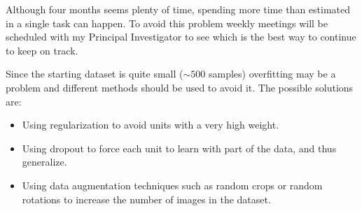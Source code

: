 
Although four months seems plenty of time, spending more time than estimated in a single task
can happen. To avoid this problem weekly meetings will be scheduled with my Principal Investigator
to see which is the best way to continue to keep on track.


Since the starting dataset is quite small (\( \sim 500 \) samples) overfitting may be a problem
and different methods should be used to avoid it. The possible solutions are:
\begin{itemize}
  \item Using regularization to avoid units with a very high weight.
  \item Using dropout to force each unit to learn with part of the data, and thus generalize.
  \item Using data augmentation techniques such as random crops or random rotations to increase
  the number of images in the dataset.
\end{itemize}
